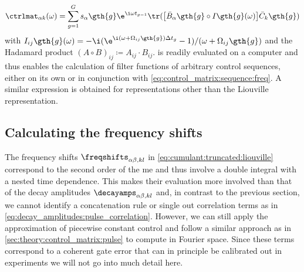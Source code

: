 \begin{equation}\label{eq:control_matrix:pulse:freq:calculation}
    \ctrlmat_{\alpha k}(\omega) = \sum_{g = 1}^G s_\alpha\gth{g}\e^{\i\omega t_{g-1}}\tr(\bigl[\bar{B}_\alpha\gth{g}\circ I\gth{g}(\omega)\bigr]\bar{C}_k\gth{g})
\end{equation}
with $I_{ij}\gth{g}(\omega) = -\i(\e^{\i(\omega + \Omega_{ij}\gth{g})\Delta t_g} - 1)/(\omega + \Omega_{ij}\gth{g})$ and the Hadamard product $(A\circ B)_{ij}\coloneqq A_{ij}\cdot B_{ij}$.  is readily evaluated on a computer and thus enables the calculation of filter functions of arbitrary control sequences, either on its own or in conjunction with \cref{eq:control_matrix:sequence:freq}. A similar expression is obtained for representations other than the Liouville representation.

\subsection{Calculating the frequency shifts}\label{sec:theory:frequency_shifts}
The frequency shifts $\freqshifts_{\alpha\beta,kl}$ in \cref{eq:cumulant:truncated:liouville} correspond to the second order of the \gls{me} and thus involve a double integral with a nested time dependence. This makes their evaluation more involved than that of the decay amplitudes $\decayamps_{\alpha\beta,kl}$ and, in contrast to the previous section, we cannot identify a concatenation rule or single out correlation terms as in \cref{eq:decay_amplitudes:pulse_correlation}. However, we can still apply the approximation of piecewise constant control and follow a similar approach as in \cref{sec:theory:control_matrix:pulse} to compute \freqshifts in Fourier space. Since these terms correspond to a coherent gate error that can in principle be calibrated out in experiments we will not go into much detail here.

